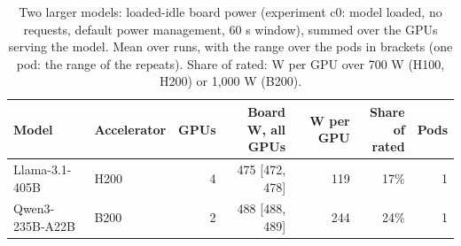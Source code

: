 \begin{table}[t]
\centering
\footnotesize
\setlength{\tabcolsep}{4pt}
\caption{Two larger models: loaded-idle board power (experiment c0: model loaded, no requests, default power management, 60 s window), summed over the GPUs serving the model. Mean over runs, with the range over the pods in brackets (one pod: the range of the repeats). Share of rated: W per GPU over 700 W (H100, H200) or 1,000 W (B200).}\label{tab:size_idle}
\begin{tabular}{llrrrrr}
\toprule
Model & Accelerator & GPUs & \makecell[r]{Board W, all\\GPUs} & W per GPU & \makecell[r]{Share of\\rated} & Pods \\
\midrule
Llama-3.1-405B & H200 & 4 & 475 {[}472, 478{]} & 119 & 17\% & 1 \\
Qwen3-235B-A22B & B200 & 2 & 488 {[}488, 489{]} & 244 & 24\% & 1 \\
\bottomrule
\end{tabular}
\end{table}
